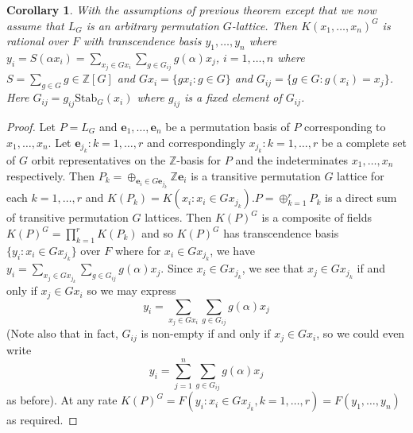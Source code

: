 \documentclass[12pt]{article}
\theoremstyle{plain}
\newtheorem{corollary}[theorem]{Corollary}
\newcommand{\Z}{\ensuremath{\mathbb{Z}}}
\begin{document}
\begin{corollary}\label{ConstructiveNoNameLemma}
With the assumptions of previous theorem except that we now assume that $L_G$ is an arbitrary permutation $G$-lattice. Then $ K(x_1,\ldots , x_n)^G$ is rational over $F$ with transcendence basis $y_1, \ldots , y_n$ where $y_i = S(\alpha x_i) = \sum_{x_j \in Gx_i}\sum_{g \in G_{ij}}g(\alpha)x_j$, $i = 1, \ldots , n$ where $S = \sum_{g\in G} g \in \Z[G]$ and $Gx_i = \lbrace gx_i : g \in G \rbrace$  and  $G_{ij} = \lbrace g \in G : g(x_i) = x_j \rbrace$. Here $G_{ij}=g_{ij}\mathrm{Stab}_{G}(x_i)$ where $g_{ij}$ is a fixed element of $G_{ij}$. 
\end{corollary}
\begin{proof}
Let $P = L_G$ and $\textbf{e}_1, \ldots , \textbf{e}_n$ be a permutation basis of $P$ corresponding to $x_1, \ldots, x_n$. Let $\textbf{e}_{j_k}: k = 1, \ldots, r$ and correspondingly $x_{j_k}: k = 1, \ldots, r$ be a complete set of $G$ orbit representatives on the $\Z$-basis for $P$ and the indeterminates $x_1, \ldots, x_n$ respectively. Then $P_k = \oplus_{ \textbf{e}_i \in G \textbf{e}_{j_{k}} } \Z \textbf{e}_i$ is a transitive permutation $G$ lattice for each $k = 1, \ldots , r$ and $K(P_k) = K(x_i : x_i \in Gx_{j_k})$.$P = \oplus^r_{k =1} P_k$ is a direct sum of transitive permutation $G$ lattices. Then $K(P)^G$ is a composite of fields $K(P)^G = \prod^r_{k =1}K(P_k)$ and so $K(P)^G$ has transcendence basis $\lbrace y_i: x_i \in Gx_{j_k}\rbrace$ over $F$ where for $x_i \in Gx_{j_k}$, we have $y_i = \sum_{x_j \in Gx_{j_k}}\sum_{g \in G_{ij}}g(\alpha)x_j$. Since $x_i \in Gx_{j_k}$, we see that $x_j \in Gx_{j_k}$ if and only if $x_j \in Gx_i$ so we may express
$$y_i = \sum_{x_j \in Gx_i}\sum_{g \in G_{ij}}g(\alpha)x_j$$ 
(Note also that in fact, $G_{ij}$ is non-empty if and only if $x_j \in Gx_i$, so we could even write 
$$y_i = \sum^n_{j=1}\sum_{g \in G_{ij}}g(\alpha)x_j$$
as before). At any rate $K(P)^G = F(y_i : x_i \in Gx_{j_k}, k = 1, \ldots,r) = F(y_1, \ldots,y_n)$ as required.

\end{proof}
\end{document}
